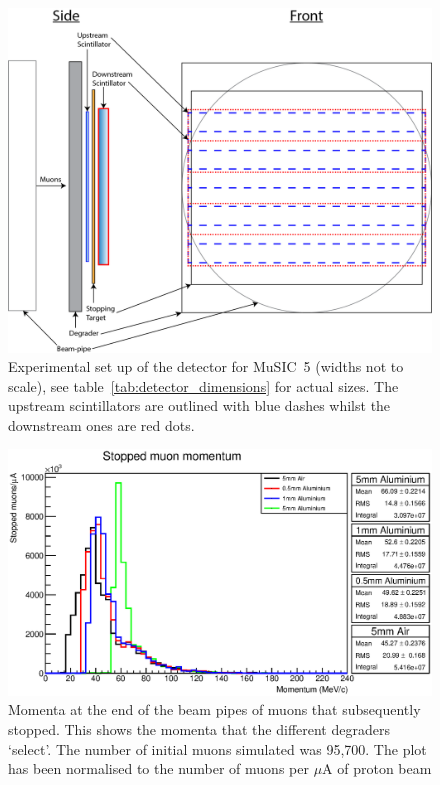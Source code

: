 \begin{figure}[htbp]
    \centering
        \includegraphics[scale=0.5]{images/momentum_spectrum/Detector_setup_music5.png}
    \caption{Experimental set up of the detector for MuSIC~5 (widths not to scale), see table~\ref{tab:detector_dimensions} for actual sizes. The upstream scintillators are outlined with blue dashes whilst the downstream ones are red dots.}
    \label{fig:m5_setup}
\end{figure}  

\begin{figure}[hptb]
  \centering
    \includegraphics[width=.9\textwidth]{images/momentum_spectrum/stopped_muon_momentum.eps}
  \caption{Momenta at the end of the beam pipes of muons that subsequently stopped. This shows the momenta that the different degraders `select'. The number of initial muons simulated was 95,700. The plot has been normalised to the number of muons per \(\mu\)A of proton beam}
  \label{fig:images_momentum_spectrum_stopped_muon_momentum}
\end{figure}


